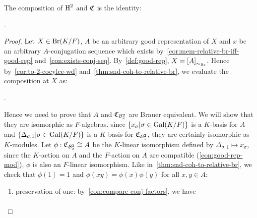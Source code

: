 \begin{lemma}\label{lem:relative-br-snd-inverse-2}
  The composition of $\operatorname{H}^{2}$ and $\operatorname{\mathfrak{C}}$ is the identity:
  \begin{center}
    .
  \end{center}
  \leanok
\end{lemma}
\begin{proof}
  Let $X \in \operatorname{Br}(K/F)$, $A$ be an arbitrary good representation of $X$ and $x$ be an arbitrary $A$-conjugation sequence which exists by~\cref{cor:mem-relative-br-iff-good-rep} and~\cref{con:exists-conj-seq}. By~\cref{def:good-rep}, $X = \left[A\right]_{\sim_{\operatorname{Br}}}$.
  Hence by~\cref{cor:to-2-cocylce-wd} and~\cref{thm:snd-coh-to-relative-br}, we evaluate the composition at $X$ as:
  \begin{center}
    .
  \end{center}
  Hence we need to prove that $A$ and $\operatorname{\mathfrak{C}}_{\mathcal{B}^{2}_{x}}$ are Brauer equivalent. We will show that they are isomorphic as $F$-algebras. since $\{x_{\sigma}|\sigma\in\operatorname{Gal}(K/F)\}$ is a $K$-basis for $A$ and $\{\Delta_{\sigma, 1}|\sigma \in \operatorname{Gal}(K/F)\}$ is a $K$-basis for $\operatorname{\mathfrak{C}}_{\mathcal{B}^{2}_{x}}$, they are certainly isomorphic as $K$-modules. Let $\phi : \operatorname{\mathfrak{C}}_{\mathcal{B}^{2}_{x}} \cong A$ be the $K$-linear isomorphism defined by $\Delta_{\sigma, 1} \mapsto x_{\sigma}$, since the $K$-action on $A$ and the $F$-action on $A$ are compatible (\cref{con:good-rep-mod}), $\phi$ is also an $F$-linear isomorphism. Like in~\cref{thm:snd-coh-to-relative-br}, we check that $\phi(1) = 1$ and $\phi(xy)=\phi(x)\phi(y)$ for all $x,y \in A$:
  \begin{enumerate}
    \item preservation of one: by~\cref{con:compare-conj-factors}, we have
          \[
          \begin{aligned}

\end{aligned}\]
\end{enumerate}
\end{proof}
